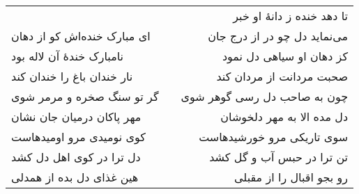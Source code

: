 \begin{center}
\begin{longtable}{l p{0.5cm} r}
&&
تا دهد خنده ز دانهٔ او خبر
\\
ای مبارک خنده‌اش کو از دهان
&&
می‌نماید دل چو در از درج جان
\\
نامبارک خندهٔ آن لاله بود
&&
کز دهان او سیاهی دل نمود
\\
نار خندان باغ را خندان کند
&&
صحبت مردانت از مردان کند
\\
گر تو سنگ صخره و مرمر شوی
&&
چون به صاحب دل رسی گوهر شوی
\\
مهر پاکان درمیان جان نشان
&&
دل مده الا به مهر دلخوشان
\\
کوی نومیدی مرو اومیدهاست
&&
سوی تاریکی مرو خورشیدهاست
\\
دل ترا در کوی اهل دل کشد
&&
تن ترا در حبس آب و گل کشد
\\
هین غذای دل بده از همدلی
&&
رو بجو اقبال را از مقبلی
\\
\end{longtable}
\end{center}
